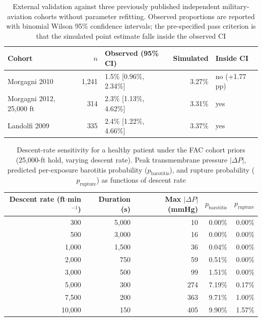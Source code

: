 \documentclass[11pt,a4paper]{article}
\begin{document}
\begin{table}[htbp]
\centering
\caption{External validation against three previously published independent military-aviation cohorts without parameter refitting. Observed proportions are reported with binomial Wilson 95\% confidence intervals; the pre-specified pass criterion is that the simulated point estimate falls inside the observed CI}
\label{tab:validation}
\small
\begin{tabular}{@{}lrlrl@{}}
\toprule
Cohort & $n$ & Observed (95\% CI) & Simulated & Inside CI \\
\midrule
Morgagni 2010              & 1{,}241 & 1.5\% [0.96\%, 2.34\%] & 3.27\% & no (+1.77 pp) \\
Morgagni 2012, 25{,}000 ft & 314     & 2.3\% [1.13\%, 4.62\%] & 3.31\% & yes \\
Landolfi 2009              & 335     & 2.4\% [1.22\%, 4.66\%] & 3.37\% & yes \\
\bottomrule
\end{tabular}
\end{table}



\begin{table}[htbp]
\centering
\caption{Descent-rate sensitivity for a healthy patient under the FAC cohort priors (25{,}000-ft hold, varying descent rate). Peak transmembrane pressure $|\Delta P|$, predicted per-exposure barotitis probability ($p_{\mathrm{barotitis}}$), and rupture probability ($p_{\mathrm{rupture}}$) as functions of descent rate}
\label{tab:descent_rate}
\small
\begin{tabular}{@{}rrrrr@{}}
\toprule
Descent rate (ft$\cdot$min$^{-1}$) & Duration (s) & Max $|\Delta P|$ (mmHg) & $p_{\mathrm{barotitis}}$ & $p_{\mathrm{rupture}}$ \\
\midrule
300     & 5{,}000 &  10 & 0.00\% & 0.00\% \\
500     & 3{,}000 &  16 & 0.00\% & 0.00\% \\
1{,}000 & 1{,}500 &  36 & 0.04\% & 0.00\% \\
2{,}000 &     750 &  59 & 0.51\% & 0.00\% \\
3{,}000 &     500 &  99 & 1.51\% & 0.00\% \\
5{,}000 &     300 & 274 & 7.19\% & 0.17\% \\
7{,}500 &     200 & 363 & 9.71\% & 1.00\% \\
10{,}000 &    150 & 405 & 9.90\% & 1.57\% \\
\bottomrule
\end{tabular}
\end{table}
\end{document}

